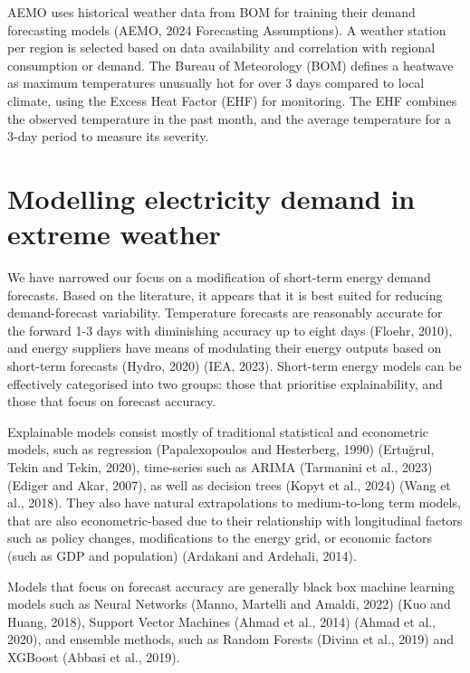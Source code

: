 \documentclass[mstat,12pt,a4paper]{unswthesis}
\begin{document}
\bigskip

AEMO uses historical weather data from BOM for training their demand
forecasting models (AEMO, 2024 Forecasting Assumptions). A weather
station per region is selected based on data availability and
correlation with regional consumption or demand. The Bureau of
Meteorology (BOM) defines a heatwave as maximum temperatures unusually
hot for over 3 days compared to local climate, using the Excess Heat
Factor (EHF) for monitoring. The EHF combines the observed temperature
in the past month, and the average temperature for a 3-day period to
measure its severity.

\section{Modelling electricity demand in extreme
weather}\label{modelling-electricity-demand-in-extreme-weather}

We have narrowed our focus on a modification of short-term energy demand
forecasts. Based on the literature, it appears that it is best suited
for reducing demand-forecast variability. Temperature forecasts are
reasonably accurate for the forward 1-3 days with diminishing accuracy
up to eight days (Floehr, 2010), and energy suppliers have means of
modulating their energy outputs based on short-term forecasts (Hydro,
2020) (IEA, 2023). Short-term energy models can be effectively
categorised into two groups: those that prioritise explainability, and
those that focus on forecast accuracy.

\bigskip

Explainable models consist mostly of traditional statistical and
econometric models, such as regression (Papalexopoulos and Hesterberg,
1990) (Ertuğrul, Tekin and Tekin, 2020), time-series such as ARIMA
(Tarmanini et al., 2023) (Ediger and Akar, 2007), as well as decision
trees (Kopyt et al., 2024) (Wang et al., 2018). They also have natural
extrapolations to medium-to-long term models, that are also
econometric-based due to their relationship with longitudinal factors
such as policy changes, modifications to the energy grid, or economic
factors (such as GDP and population) (Ardakani and Ardehali, 2014).

\bigskip

Models that focus on forecast accuracy are generally black box machine
learning models such as Neural Networks (Manno, Martelli and Amaldi,
2022) (Kuo and Huang, 2018), Support Vector Machines (Ahmad et al.,
2014) (Ahmad et al., 2020), and ensemble methods, such as Random Forests
(Divina et al., 2019) and XGBoost (Abbasi et al., 2019).
\end{document}
